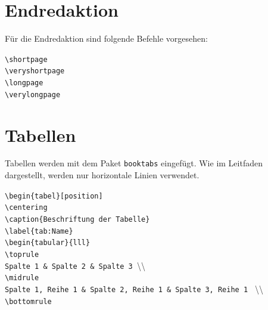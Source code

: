 \newpage

%
%






\section{Endredaktion}
\label{sec:endredaktion}

Für die Endredaktion sind folgende Befehle vorgesehen:

\begin{syntax}
\verb|\shortpage|\\
\verb|\veryshortpage|\\
\verb|\longpage|\\
\verb|\verylongpage|
\end{syntax}

\section{Tabellen}

Tabellen werden mit dem Paket \verb|booktabs| eingefügt. Wie im Leitfaden dargestellt, werden nur horizontale Linien verwendet.

\begin{syntax}
\verb|\begin{tabel}[position]|\\
\verb|\centering|\\
\verb|\caption{Beschriftung der Tabelle}|\\
\verb|\label{tab:Name}|\\
\verb|\begin{tabular}{lll}|\\
\verb|\toprule|\\
\verb|Spalte 1 & Spalte 2 & Spalte 3 |\textbackslash\textbackslash \\
\verb|\midrule|\\
\verb|Spalte 1, Reihe 1 & Spalte 2, Reihe 1 & Spalte 3, Reihe 1 | \textbackslash\textbackslash \\
\verb|\bottomrule|
\end{syntax}

